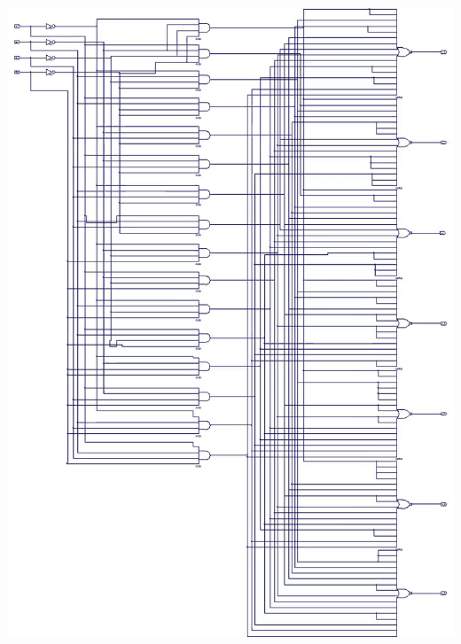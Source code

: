 \documentclass[12pt]{article}
\begin{document}
	\begin{center}
		\includegraphics[scale=.55]{seven_segment_sch.png}
	\end{center}
	
\end{document}

